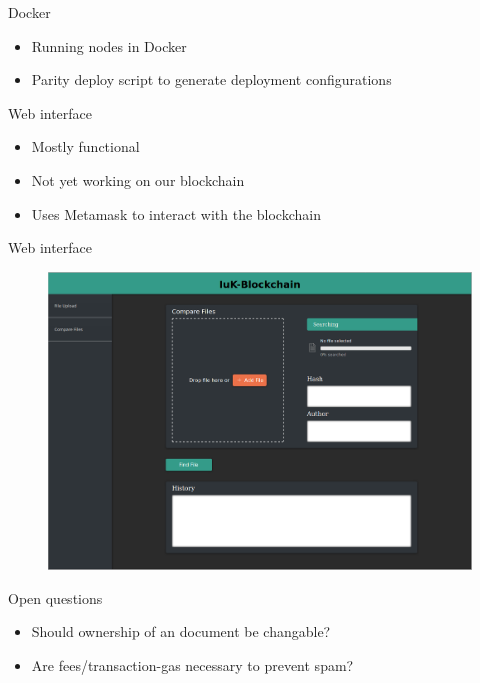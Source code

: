 \documentclass[10pt]{beamer}
\begin{document}
\begin{frame}{Docker}
	\begin{itemize}
		\item Running nodes in Docker
		\item Parity deploy script to generate deployment configurations
	\end{itemize}
\end{frame}

\begin{frame}{Web interface}
	\begin{itemize}
		\item Mostly functional
		\item Not yet working on our blockchain
		\item Uses Metamask to interact with the blockchain
	\end{itemize}
\end{frame}

\begin{frame}{Web interface}
	\begin{figure}
		\includegraphics[width=1\textwidth]{images/GUI-180603_1.png}
	\end{figure}
\end{frame}

\begin{frame}{Open questions}
	\begin{itemize}
		\item Should ownership of an document be changable?
		\item Are fees/transaction-gas necessary to prevent spam?
	\end{itemize}
\end{frame}

\end{document}
